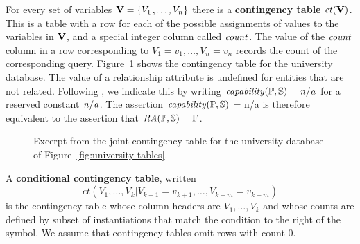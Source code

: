 \documentclass{acm_proc_article-sp}
\newcommand{\ct}{\mathit{ct}}
\begin{document}
For every set of variables $\set{V} = \{\V_{1}$,$\ldots,\V_{n} \}$ there is a \textbf{contingency table} $\ct(\set{V})$. %
This is a table with a row for each of the possible assignments of values to the variables in $\set{V}$, and a special integer column called $\qcount$. 
The value of the $\qcount$ column in a row 
corresponding to $V_{1} = v_{1},\ldots,V_{n} = v_{n}$ records the count of the 
corresponding query. 
Figure~\ref{fig:ct} shows the contingency table for the university database. 
The value of a relationship attribute is undefined for entities that are not related.
Following \cite{Russell2010}, %
we indicate this by writing 
$\it{capability(\P,\S)} = n/a $ for a reserved constant $\it{n/a}$. 
The assertion $\it{capability(\P,\S)}$ = n/a is therefore equivalent to the assertion that $\ra(\P,\S) = \false$.
\begin{figure}[htbp]
\begin{center}
\caption{Excerpt from the joint contingency table for the university database of Figure~\ref{fig:university-tables}. %
\label{fig:ct}}
\end{center}
\end{figure}
A \textbf{conditional contingency table}, written $$\ct(V_{1},\ldots,V_{k}|V_{k+1} = v_{k+1},\ldots, V_{k+m} = v_{k+m})$$
is the contingency table whose column headers are $V_{1},\ldots,V_{k}$ and whose counts are  defined by subset of instantiations that match the condition to the right of the $\vert$ symbol.  %
We assume that contingency tables omit rows with count 0.
%
\end{document}
